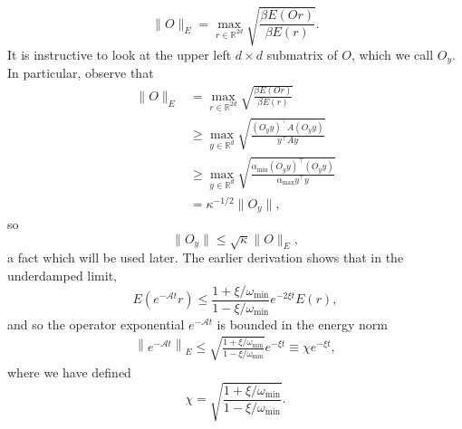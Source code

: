 \documentclass[prx,onecolumn,floatfix,longbibliography,notitlepage, nofootinbib]{revtex4-1}
\renewcommand{\geq}{\geqslant}
\renewcommand{\leq}{\leqslant}
\begin{document}
\begin{appendix}
\begin{equation}
    \|O\|_E = \max_{r\in \mathbb{R}^{2d}} \sqrt{\frac{\beta E(Or)}{\beta E(r)}}.
\end{equation}
It is instructive to look at the upper left $d \times d$ submatrix of $O$, which we call $O_{y}$. In particular, observe that
\begin{align}
     \|O\|_E &= \max_{r\in \mathbb{R}^{2d}} \sqrt{\frac{\beta E(Or)}{\beta E(r)}} \\
     & \geq \max_{y \in \mathbb{R}^{d}}\sqrt{\frac{(O_{y}y)^\intercal A (O_{y}y)}{y^\intercal A y}} \\
     & \geq 
      \max_{y \in \mathbb{R}^{d}}\sqrt{\frac{\alpha_\text{min}(O_{y}y)^\intercal (O_{y}y)}{\alpha_\text{max}y^\intercal  y}} \\
      & = \kappa^{-1/2} \|O_{y}\|,
\end{align}
so
\begin{equation}
    \|O_y\| \leq \sqrt{\kappa}\|O\|_E,
\end{equation}
a fact which will be used later. The earlier derivation shows that in the underdamped limit,
\begin{equation}
    E\left(e^{-\mathcal{A} t} r \right) \leq \frac{1+\xi/\omega_\text{min}}{1-\xi/\omega_\text{min}} e^{-2 \xi t} E(r),
\end{equation}
and so the operator exponential $e^{-\mathcal{A} t}$ is bounded in the energy norm
\begin{align}
    \left\|e^{-\mathcal{A} t}\right\|_E\leq  \sqrt{\frac{1+\xi/\omega_\text{min}}{1-\xi/\omega_\text{min}}}e^{- \xi t} \equiv \chi e^{-\xi t},
\end{align}
where we have defined
\begin{equation}
    \chi = \sqrt{\frac{1+\xi/\omega_\text{min}}{1-\xi/\omega_\text{min}}}.
\end{equation}


\end{appendix}
\end{document}
